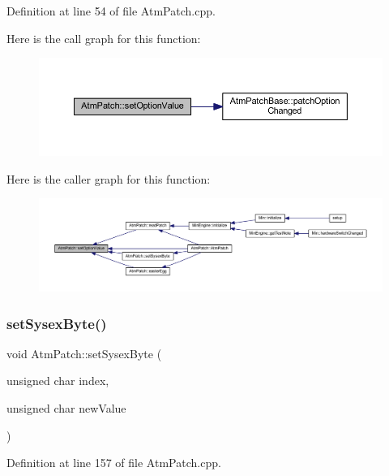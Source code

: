 Definition at line 54 of file Atm\+Patch.\+cpp.

Here is the call graph for this function\+:
\nopagebreak
\begin{figure}[H]
\begin{center}
\leavevmode
\includegraphics[width=350pt]{class_atm_patch_a1139606bcbffe63881b3f175f577d8e1_cgraph}
\end{center}
\end{figure}
Here is the caller graph for this function\+:
\nopagebreak
\begin{figure}[H]
\begin{center}
\leavevmode
\includegraphics[width=350pt]{class_atm_patch_a1139606bcbffe63881b3f175f577d8e1_icgraph}
\end{center}
\end{figure}
\mbox{\label{class_atm_patch_acc2729c3b10aa4d7f98e67caa3b80255}} 
\subsubsection{\texorpdfstring{set\+Sysex\+Byte()}{setSysexByte()}}
{\footnotesize\ttfamily void Atm\+Patch\+::set\+Sysex\+Byte (\begin{DoxyParamCaption}\item[{unsigned char}]{index,  }\item[{unsigned char}]{new\+Value }\end{DoxyParamCaption})}



Definition at line 157 of file Atm\+Patch.\+cpp.

